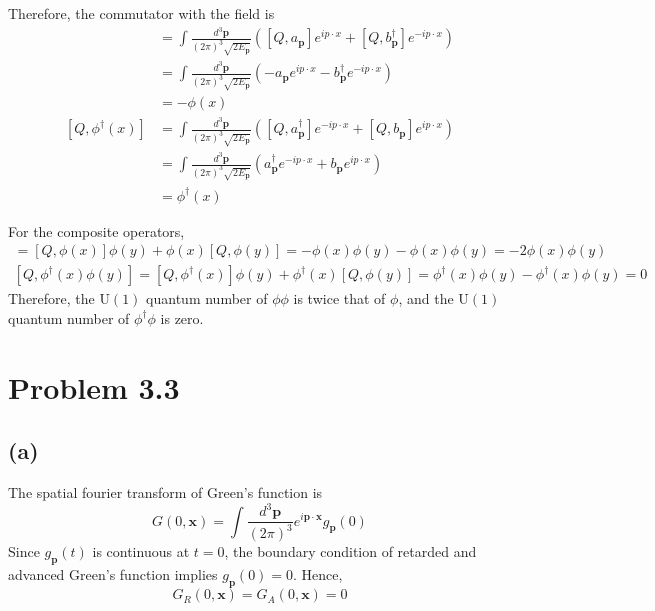 \documentclass[a4paper,11pt]{article}
\begin{document}
Therefore, the commutator with the field is
\begin{align}
    [Q, \phi(x)] 
    &= \int \frac{d^3\mathbf{p}}{(2\pi)^3\sqrt{2E_{\mathbf{p}}}} \left([Q, a_{\mathbf{p}}] e^{ip\cdot x} + [Q, b_{\mathbf{p}}^\dagger] e^{-ip\cdot x}\right) \\
    &= \int \frac{d^3\mathbf{p}}{(2\pi)^3\sqrt{2E_{\mathbf{p}}}} \left(-a_{\mathbf{p}} e^{ip\cdot x} - b_{\mathbf{p}}^\dagger e^{-ip\cdot x}\right) \\
    &= -\phi(x) \\
    [Q, \phi^\dagger(x)]
    &= \int \frac{d^3\mathbf{p}}{(2\pi)^3\sqrt{2E_{\mathbf{p}}}} \left([Q, a_{\mathbf{p}}^\dagger] e^{-ip\cdot x} + [Q, b_{\mathbf{p}}] e^{ip\cdot x}\right) \\
    &= \int \frac{d^3\mathbf{p}}{(2\pi)^3\sqrt{2E_{\mathbf{p}}}} \left(a_{\mathbf{p}}^\dagger e^{-ip\cdot x} + b_{\mathbf{p}} e^{ip\cdot x}\right) \\
    &= \phi^\dagger(x)
\end{align}

For the composite operators,
\begin{gather}
    [Q, \phi(x)\phi(y)] = [Q, \phi(x)]\phi(y) + \phi(x)[Q, \phi(y)] = -\phi(x)\phi(y) - \phi(x)\phi(y) = -2\phi(x)\phi(y)\\
    [Q, \phi^\dagger(x)\phi(y)] = [Q, \phi^\dagger(x)]\phi(y) + \phi^\dagger(x)[Q, \phi(y)] = \phi^\dagger(x)\phi(y) - \phi^\dagger(x)\phi(y) = 0
\end{gather}
Therefore, the $\mathrm{U}(1)$ quantum number of $\phi\phi$ is twice that of $\phi$, and the $\mathrm{U}(1)$ quantum number of $\phi^\dagger\phi$ is zero.


\section{Problem 3.3}

\subsection{(a)}

The spatial fourier transform of Green's function is
\begin{equation}
    G(0, \mathbf{x}) = \int \frac{d^3\mathbf{p}}{(2\pi)^3} e^{i\mathbf{p}\cdot\mathbf{x}} g_{\mathbf{p}}(0)
\end{equation}
Since $g_{\mathbf{p}}(t)$ is continuous at $t=0$, the boundary condition of retarded and advanced Green's function implies $g_{\mathbf{p}}(0) = 0$. Hence, 
\begin{equation}
    G_R(0, \mathbf{x}) = G_A(0, \mathbf{x}) = 0
\end{equation}
\end{document}
